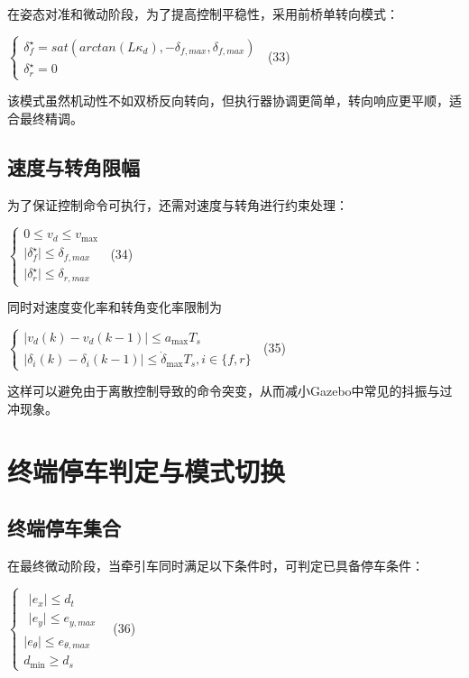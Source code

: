 在姿态对准和微动阶段，为了提高控制平稳性，采用前桥单转向模式：

\(\left\{ \begin{array}{r}
\delta_{f}^{\star} = sat\left( arctan(L\kappa_{d}), - \delta_{f,max},\delta_{f,max} \right) \\
\delta_{r}^{\star} = 0
\end{array} \right.\ \) (33)

该模式虽然机动性不如双桥反向转向，但执行器协调更简单，转向响应更平顺，适合最终精调。

\subsection{速度与转角限幅}

为了保证控制命令可执行，还需对速度与转角进行约束处理：

\(\left\{ \begin{array}{r}
0 \leq v_{d} \leq v_{\max} \\
 \mid \delta_{f}^{\star} \mid \leq \delta_{f,max} \\
 \mid \delta_{r}^{\star} \mid \leq \delta_{r,max}
\end{array} \right.\ \) (34)

同时对速度变化率和转角变化率限制为

\(\left\{ \begin{array}{r}
 \mid v_{d}(k) - v_{d}(k - 1) \mid \leq a_{\max}T_{s} \\
 \mid \delta_{i}(k) - \delta_{i}(k - 1) \mid \leq {\dot{\delta}}_{\max}T_{s},i \in \{ f,r\}
\end{array} \right.\ \) (35)

这样可以避免由于离散控制导致的命令突变，从而减小Gazebo中常见的抖振与过冲现象。

\section{终端停车判定与模式切换}

\subsection{终端停车集合}

在最终微动阶段，当牵引车同时满足以下条件时，可判定已具备停车条件：

\(\left\{ \begin{array}{r}
\begin{array}{r}
 \mid e_{x} \mid \leq d_{t} \\
 \mid e_{y} \mid \leq e_{y,max}
\end{array} \\
 \mid e_{\theta} \mid \leq e_{\theta,max} \\
d_{\min} \geq d_{s}
\end{array} \right.\ \) (36)

